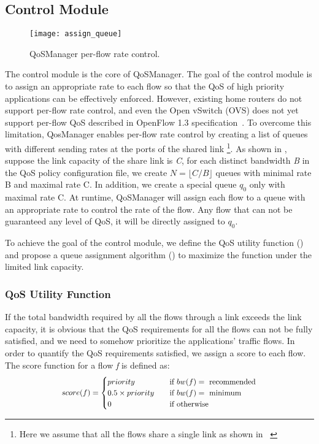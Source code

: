 \subsection{Control Module}

\begin{figure}[htb]
  \centering
  \texttt{[image: assign\_queue]}
  \caption{QoSManager per-flow rate control.}
  \label{fig:assign_queue}
\end{figure}

The control module is the core of QoSManager. The goal of the control module is to assign an appropriate rate to each flow so that
the QoS of high priority applications can be effectively enforced. However, existing home routers do not support per-flow rate control,
and even the Open vSwitch (OVS) does not yet support per-flow QoS described in OpenFlow 1.3 specification~\cite{openflow13}. To overcome
this limitation, QosManager enables per-flow rate control by creating a list of queues with different sending rates at the ports of
the shared link \footnote{Here we assume that all the flows share a single link as shown in ~}. As shown in ,
suppose the link capacity of the share link is \emph{C}, for each distinct bandwidth \emph{B} in the QoS policy configuration file,
we create $ N = \lfloor C / B \rfloor $ queues with minimal rate B and maximal rate C. In addition, we create a special queue $q_0$
only with maximal rate C. At runtime, QoSManager will assign each flow to a queue with an appropriate rate to control the rate of the
flow. Any flow that can not be guaranteed any level of QoS, it will be directly assigned to $q_0$.

To achieve the goal of the control module, we define the QoS utility function () and propose a queue assignment
algorithm () to maximize the function under the limited link capacity.

\subsubsection{QoS Utility Function}
\label{sect:qosUF}
If the total bandwidth required by all the flows through a link exceeds the link capacity, it is obvious that the QoS requirements for
all the flows can not be fully satisfied, and we need to somehow prioritize the applications' traffic flows. In order to quantify the QoS
requirements satisfied, we assign a score to each flow. The score function for a flow \emph{f} is defined as:
\begin{equation}
\scalebox{0.9}{
  $score(f) =
    \begin{cases}
      priority       & \quad \text{if } bw(f) = \text{ recommended}\\
      0.5 \times priority & \quad \text{if } bw(f) = \text{ minimum}\\
      0              & \quad \text{if } \text{otherwise}\\
    \end{cases}$
}
\end{equation}

